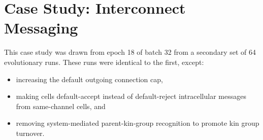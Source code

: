 \section{Case Study: Interconnect Messaging} \label{sec:case_study_2032}



This case study was drawn from epoch 18 of batch 32 from a secondary set of 64 evolutionary runs.
These runs were identical to the first, except:
\begin{itemize}
  \item increasing the default outgoing connection cap,
  \item making cells default-accept instead of default-reject intracellular messages from same-channel cells, and
  \item removing system-mediated parent-kin-group recognition to promote kin group turnover.
\end{itemize}

